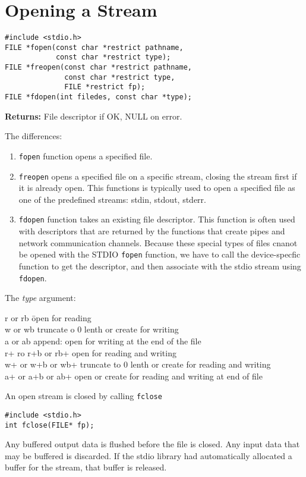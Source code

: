 \documentclass[a4paper,10pt]{book}
\begin{document}
\section{Opening a Stream}
\begin{verbatim}
#include <stdio.h>
FILE *fopen(const char *restrict pathname,
            const char *restrict type);
FILE *freopen(const char *restrict pathname,
              const char *restrict type,
              FILE *restrict fp);
FILE *fdopen(int filedes, const char *type);
\end{verbatim}
\textbf{Returns:} File descriptor if OK, NULL on error.

The differences:
\begin{enumerate}
\item \verb|fopen| function opens a specified file.
\item \verb|freopen| opens a specified file on a specific stream, closing the
stream first if it is already open. This functions is typically used to open a
specified file as one of the predefined streams: stdin, stdout, stderr.
\item \verb|fdopen| function takes an existing file descriptor. This function is
often used with descriptors that are returned by the functions that create pipes
and network communication channels. Because these special types of files cnanot
be opened with the STDIO \verb|fopen| function, we have to call the
device-specfic function to get the descriptor, and then associate with the stdio
stream using \verb|fdopen|.
\end{enumerate}

The \emph{type} argument:
\begin{tabbing}
r or rb \hspace{3cm}\= open for reading\\
w or wb \> truncate o 0 lenth or create for writing\\
a or ab \> append: open for writing at the end of the file\\
r+ ro r+b or rb+ \> open for reading and writing\\
w+ or w+b or wb+ \> truncate to 0 lenth or create for reading and writing\\
a+ or a+b or ab+ \> open or create for reading and writing at end of file
\end{tabbing}
An open stream is closed by calling \verb|fclose|
\begin{verbatim}
#include <stdio.h>
int fclose(FILE* fp);
\end{verbatim}
Any buffered output data is flushed before the file is closed. Any input data
that may be buffered is discarded. If the stdio library had automatically
allocated a buffer for the stream, that buffer is released.
\end{document}
